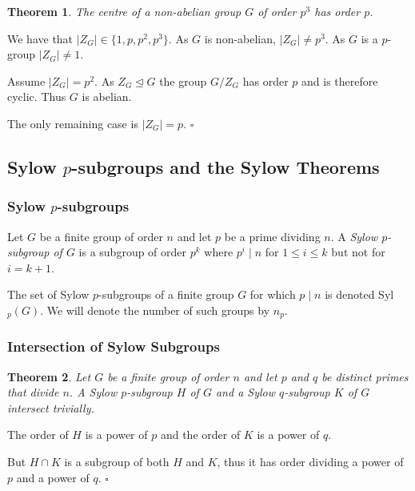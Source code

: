 \documentclass[10pt]{article}
\newtheorem{theorem}{Theorem}[section]
\newenvironment{proof}[1][Proof]{\begin{trivlist}
\item[\hskip \labelsep {\itshape #1}]}{\end{trivlist}}
\newenvironment{definition}[1][Definition]{\begin{trivlist}
\item[\hskip \labelsep {\bfseries #1}]}{\end{trivlist}}
\begin{document}
\begin{theorem}
The centre of a non-abelian group $G$ of order $p^3$ has order $p$.
\end{theorem}

\begin{proof}
We have that $|Z_G| \in \{1, p, p^2, p^3\}$. As $G$ is non-abelian, $|Z_G| \neq p^3$. As $G$ is a $p$-group $|Z_G| \neq 1$.

Assume $|Z_G| = p^2$. As $Z_G \mathrel{\unlhd} G$ the group $G/Z_G$ has order $p$ and is therefore cyclic. Thus $G$ is abelian.

The only remaining case is $|Z_G| = p$. $\square$
\end{proof}

\subsection{Sylow $p$-subgroups and the Sylow Theorems}

\subsubsection{Sylow $p$-subgroups}

\begin{definition}
Let $G$ be a finite group of order $n$ and let $p$ be a prime dividing $n$. A \emph{Sylow $p$-subgroup of $G$} is a subgroup of order $p^k$ where $p^i \;|\; n$ for $1 \leq i \leq k$ but not for $i = k + 1$.
\end{definition}

\begin{definition}
The set of Sylow $p$-subgroups of a finite group $G$ for which $p \;|\; n$ is denoted Syl$_p(G)$. We will denote the number of such groups by $n_p$.
\end{definition}

\subsubsection{Intersection of Sylow Subgroups}

\begin{theorem}
Let $G$ be a finite group of order $n$ and let $p$ and $q$ be distinct primes that divide $n$. A Sylow $p$-subgroup $H$ of $G$ and a Sylow $q$-subgroup $K$ of $G$ intersect trivially.
\end{theorem}

\begin{proof}
The order of $H$ is a power of $p$ and the order of $K$ is a power of $q$.

But $H \cap K$ is a subgroup of both $H$ and $K$, thus it has order dividing a power of $p$ and a power of $q$. $\square$
\end{proof}
\end{document}
